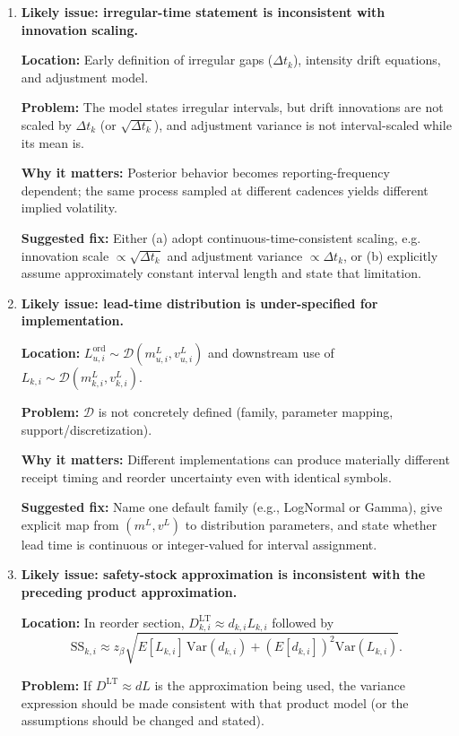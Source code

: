 \documentclass[11pt]{article}
\begin{document}
\begin{enumerate}[leftmargin=*]
\item \textbf{Likely issue: irregular-time statement is inconsistent with innovation scaling.}

\textbf{Location:} Early definition of irregular gaps ($\Delta t_k$), intensity drift equations, and adjustment model.

\textbf{Problem:} The model states irregular intervals, but drift innovations are not scaled by $\Delta t_k$ (or $\sqrt{\Delta t_k}$), and adjustment variance is not interval-scaled while its mean is.

\textbf{Why it matters:} Posterior behavior becomes reporting-frequency dependent; the same process sampled at different cadences yields different implied volatility.

\textbf{Suggested fix:} Either (a) adopt continuous-time-consistent scaling, e.g. innovation scale $\propto\sqrt{\Delta t_k}$ and adjustment variance $\propto\Delta t_k$, or (b) explicitly assume approximately constant interval length and state that limitation.

\item \textbf{Likely issue: lead-time distribution is under-specified for implementation.}

\textbf{Location:} $L^{\mathrm{ord}}_{u,i}\sim\mathcal{D}(m^L_{u,i},v^L_{u,i})$ and downstream use of $L_{k,i}\sim\mathcal{D}(m^L_{k,i},v^L_{k,i})$.

\textbf{Problem:} $\mathcal{D}$ is not concretely defined (family, parameter mapping, support/discretization).

\textbf{Why it matters:} Different implementations can produce materially different receipt timing and reorder uncertainty even with identical symbols.

\textbf{Suggested fix:} Name one default family (e.g., LogNormal or Gamma), give explicit map from $(m^L,v^L)$ to distribution parameters, and state whether lead time is continuous or integer-valued for interval assignment.

\item \textbf{Likely issue: safety-stock approximation is inconsistent with the preceding product approximation.}

\textbf{Location:} In reorder section, $D^{\mathrm{LT}}_{k,i}\approx d_{k,i}L_{k,i}$ followed by
\[
\text{SS}_{k,i}\approx z_\beta\sqrt{E[L_{k,i}]\,\mathrm{Var}(d_{k,i})+(E[d_{k,i}])^2\mathrm{Var}(L_{k,i})}.
\]

\textbf{Problem:} If $D^{\mathrm{LT}}\approx dL$ is the approximation being used, the variance expression should be made consistent with that product model (or the assumptions should be changed and stated).


\end{enumerate}
\end{document}
